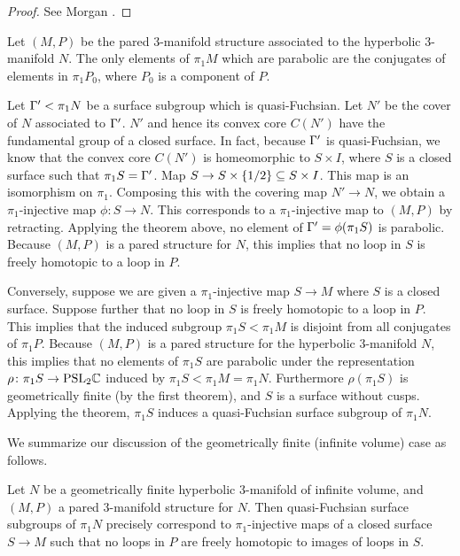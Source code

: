 \begin{proof}

See Morgan \cite[Proposition 7.1]{Mo}. %

\end{proof}


Let $(M,P)$ be the pared $3$-manifold structure associated to the hyperbolic
$3$-manifold $N$. The only elements of $\pi_1M$ which are parabolic are the
conjugates of elements in $\pi_1P_0$, where $P_0$ is a component of $P$.

Let $\Gamma' < \pi_1N$ be a surface subgroup which is quasi-Fuchsian. Let $N'$ be
the cover of $N$ associated to $\Gamma'$. $N'$ and hence its convex core $C(N')$
have the fundamental group of a closed surface. In fact, because $\Gamma'$ is
quasi-Fuchsian, we know that the convex core $C(N')$ is homeomorphic to $S
\times I$, where $S$ is a closed surface such that $\pi_1S = \Gamma'$.  Map $S \to
S \times \{1/2\} \subseteq S \times I$. This map is an isomorphism on $\pi_1$.
Composing this with the covering map $N' \to N$, we obtain a $\pi_1$-injective
map $\phi \colon S \to N$.  This corresponds to a $\pi_1$-injective map to
$(M,P)$ by retracting.  Applying the theorem above, no element of
$\Gamma'=\phi(\pi_1S)$ is parabolic.  Because $(M,P)$ is a pared structure for
$N$, this implies that no loop in $S$ is freely homotopic to a loop in $P$.

Conversely, suppose we are given a $\pi_1$-injective map $S \to M$ where $S$ is
a closed surface.  Suppose further that no loop in $S$ is freely homotopic to
a loop in $P$.  This implies that the induced subgroup $\pi_1S < \pi_1M$ is
disjoint from all conjugates of $\pi_1P$.  Because $(M,P)$ is a pared structure
for the hyperbolic $3$-manifold $N$, this implies that no elements of $\pi_1S$
are parabolic under the representation $\rho \colon \pi_1S \to \mathrm{PSL}_2\mathbb{C}$
induced by $\pi_1S < \pi_1M=\pi_1N$.  Furthermore $\rho(\pi_1S)$ is
geometrically finite (by the first theorem), and $S$ is a surface without
cusps.  Applying the theorem, $\pi_1S$ induces a quasi-Fuchsian surface
subgroup of $\pi_1N$.

We summarize our discussion of the geometrically finite (infinite volume) case
as follows.

\begin{prop}

Let $N$ be a geometrically finite hyperbolic $3$-manifold of infinite volume,
and $(M,P)$ a pared $3$-manifold structure for $N$. Then quasi-Fuchsian surface
subgroups of $\pi_1N$ precisely correspond to $\pi_1$-injective maps of
a closed surface $S \to M$ such that no loops in $P$ are freely homotopic to
images of loops in $S$.

\end{prop}

